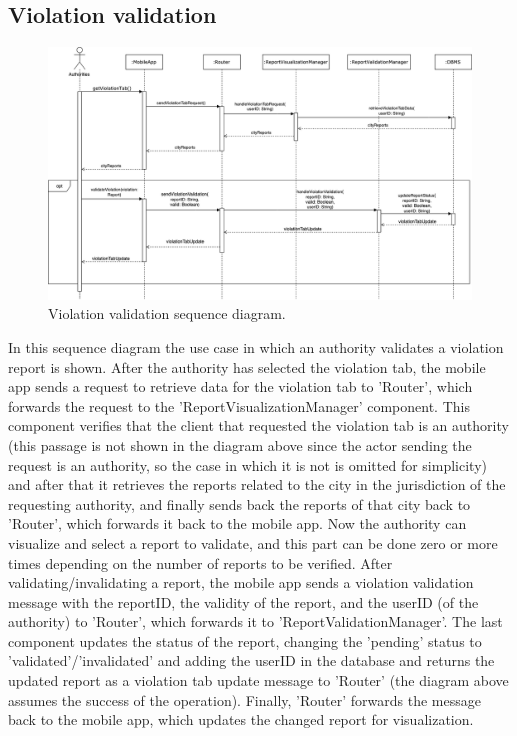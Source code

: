 \subsection{Violation validation}
\begin{figure}[H]
	\centering
	\includegraphics[width=\linewidth]{Images/SequenceDiagramViolationValidation}
	\caption{Violation validation sequence diagram.}
\end{figure}
In this sequence diagram the use case in which an authority validates a violation report is shown. After the authority has selected the violation tab, the mobile app sends a request to retrieve data for the violation tab to 'Router', which forwards the request to the 'ReportVisualizationManager' component. This component verifies that the client that requested the violation tab is an authority (this passage is not shown in the diagram above since the actor sending the request is an authority, so the case in which it is not is omitted for simplicity) and after that it retrieves the reports related to the city in the jurisdiction of the requesting authority, and finally sends back the reports of that city back to 'Router', which forwards it back to the mobile app. Now the authority can visualize and select a report to validate, and this part can be done zero or more times depending on the number of reports to be verified. After validating/invalidating a report, the mobile app sends a violation validation message with the reportID, the validity of the report, and the userID (of the authority) to 'Router', which forwards it to 'ReportValidationManager'. The last component updates the status of the report, changing the 'pending' status to 'validated'/'invalidated' and adding the userID in the database and returns the updated report as a violation tab update message to 'Router' (the diagram above assumes the success of the operation). Finally, 'Router' forwards the message back to the mobile app, which updates the changed report for visualization.

